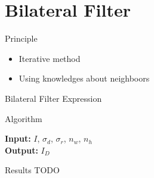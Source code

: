 \section{Bilateral Filter}
\frame{\sectionpage}

\begin{frame}{Principle}

\begin{itemize}
    \item Iterative method
    \item Using knowledges about neighboors
\end{itemize}

\end{frame}

\begin{frame}{Bilateral Filter Expression}
\end{frame}

\begin{frame}{Algorithm}
\begin{algorithm}[H]
    \caption{Filtering Algorithm} %
    \begin{algorithmic}[1]
        \newline
        \textbf{Input:} $I$, $\sigma_{d}$, $\sigma_{r}$, $n_w$, $n_h$ \\
        \textbf{Output:} $I_{D}$
        \EndFor
        \EndProcedure
    \end{algorithmic}
\end{algorithm}
\end{frame}

\begin{frame}{Results}
\centering
TODO
\end{frame}